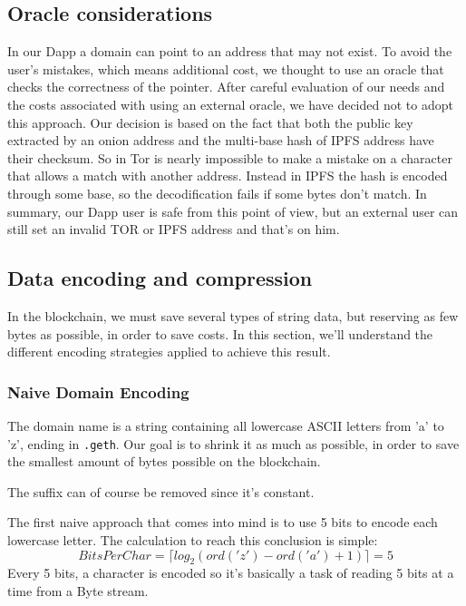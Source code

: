 \documentclass[main.tex]{subfiles}
\begin{document}
\subsection{Oracle considerations}
In our Dapp a domain can point to an address that may not exist. To avoid the user's mistakes, which means additional cost, we thought to use an oracle that checks the correctness of the pointer. After careful evaluation of our needs and the costs associated with using an external oracle, we have decided not to adopt this approach. Our decision is based on the fact that both the public key extracted by an onion address and the multi-base hash of IPFS address have their checksum. So in Tor is nearly impossible to make a mistake on a character that allows a match with another address. Instead in IPFS the hash is encoded through some base, so the decodification fails if some bytes don't match. In summary, our Dapp user is safe from this point of view, but an external user can still set an invalid TOR or IPFS address and that's on him.


\subsection{Data encoding and compression}
In the blockchain, we must save several types of string data, but reserving as few bytes as possible, in order to save costs.
In this section, we'll understand the different encoding strategies applied to achieve this result.

\subsubsection{Naive Domain Encoding}
The domain name is a string containing all lowercase ASCII letters from 'a' to 'z', ending in \texttt{.geth}.
Our goal is to shrink it as much as possible, in order to save the smallest amount of bytes possible on the blockchain.

The suffix can of course be removed since it's constant.

The first naive approach that comes into mind is to use 5 bits to encode each lowercase letter.
The calculation to reach this conclusion is simple:
\[ BitsPerChar = \lceil log_2({ord('z') - ord('a') + 1}) \rceil = 5 \]
Every 5 bits, a character is encoded so it's basically a task of reading 5 bits at a time from a Byte stream.
\end{document}
